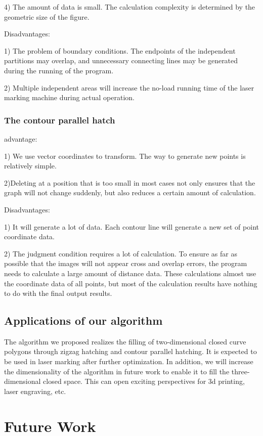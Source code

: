 \documentclass{apmcmthesis}
\begin{document}
4) The amount of data is small. The calculation complexity is determined by the geometric size of the figure.


Disadvantages:


1) The problem of boundary conditions. The endpoints of the independent partitions may overlap, and unnecessary connecting lines may be generated during the running of the program.


2) Multiple independent areas will increase the no-load running time of the laser marking machine during actual operation.


\subsubsection{The contour parallel hatch}


advantage:


1) We use vector coordinates to transform. The way to generate new points is relatively simple.


2)Deleting at a position that is too small in most cases not only ensures that the graph will not change suddenly, but also reduces a certain amount of calculation.


Disadvantages:


1) It will generate a lot of data. Each contour line will generate a new set of point coordinate data.


2) The judgment condition requires a lot of calculation. To ensure as far as possible that the images will not appear cross and overlap errors, the program needs to calculate a large amount of distance data. These calculations almost use the coordinate data of all points, but most of the calculation results have nothing to do with the final output results.

\subsection{Applications of our algorithm}

The algorithm we proposed realizes the filling of two-dimensional closed curve polygons through zigzag hatching and contour parallel hatching. It is expected to be used in laser marking after further optimization. In addition, we will increase the dimensionality of the algorithm in future work to enable it to fill the three-dimensional closed space. This can open exciting perspectives for 3d printing, laser engraving, etc.

\section{Future Work}
\end{document}
